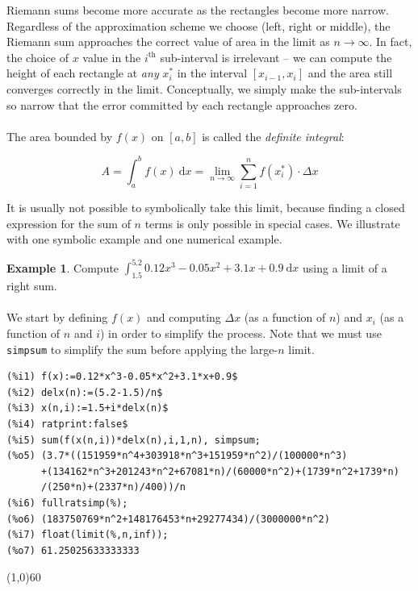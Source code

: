 \documentclass[10.5pt,twoside]{report}
\theoremstyle{definition}
\newtheorem{exmp}{Example}[section]
\begin{document}
Riemann sums become more accurate as the rectangles become more narrow.  Regardless of the approximation scheme we choose (left, right or middle), the Riemann sum approaches the correct value of area in the limit as $n \to \infty$.  In fact, the choice of $x$ value in the $i^{\mathrm{th}}$ sub-interval is irrelevant -- we can compute the height of each rectangle at \textit{any} $x_i^*$ in the interval $[x_{i-1},x_i]$ and the area still converges correctly in the limit.  Conceptually, we simply make the sub-intervals so narrow that the error committed by each rectangle approaches zero.\\
${}$\\
The area bounded by $f(x)$ on $[a,b]$ is called the \textit{definite integral}:

$$
A  = \int_{a}^{b} f(x) \ \mathrm{d}x = \lim_{n \to \infty} \sum_{i=1}^{n} f(x_i^*) \cdot \Delta x $$

It is usually not possible to symbolically take this limit, because finding a closed expression for the sum of $n$ terms is only possible in special cases.  We illustrate with one symbolic example and one numerical example.

\begin{exmp} Compute $\displaystyle \int_{1.5}^{5.2} 0.12x^3-0.05x^2+3.1x+0.9 \ \mathrm{d}x$ using a limit of a right sum.\\

${}$\\

We start by defining $f(x)$ and computing $\Delta x$ (as a function of $n$) and $x_i$ (as a function of $n$ and $i$) in order to simplify the process.  Note that we must use \verb|simpsum| to simplify the sum before applying the large-$n$ limit.

\begin{verbatim}
(%i1) f(x):=0.12*x^3-0.05*x^2+3.1*x+0.9$
(%i2) delx(n):=(5.2-1.5)/n$
(%i3) x(n,i):=1.5+i*delx(n)$
(%i4) ratprint:false$
(%i5) sum(f(x(n,i))*delx(n),i,1,n), simpsum;
(%o5) (3.7*((151959*n^4+303918*n^3+151959*n^2)/(100000*n^3)
      +(134162*n^3+201243*n^2+67081*n)/(60000*n^2)+(1739*n^2+1739*n)
      /(250*n)+(2337*n)/400))/n
(%i6) fullratsimp(%);
(%o6) (183750769*n^2+148176453*n+29277434)/(3000000*n^2)
(%i7) float(limit(%,n,inf));
(%o7) 61.25025633333333
\end{verbatim}


\end{exmp}

\line(1,0){60}
\linethickness{0.5mm}
\end{document}
